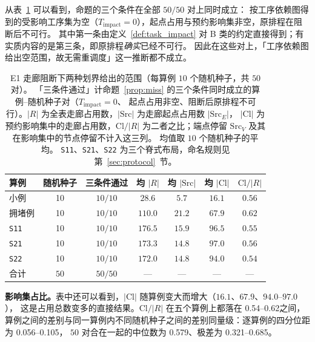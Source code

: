 \documentclass[manuscript,screen,review]{acmart}
\newcommand{\NSeeds}{10}
\newcommand{\NPairs}{50}
\newcommand{\PassMiss}{\NPairs/\NPairs}      %
\newcommand{\EoneCloLo}{0.54}
\newcommand{\EoneCloHi}{0.62}
\newcommand{\EoneFracIqrLo}{0.056}  %
\newcommand{\EoneFracIqrHi}{0.105}  %
\newcommand{\EoneFracMed}{0.579}    %
\newcommand{\EoneFracMin}{0.321}    %
\newcommand{\EoneFracMax}{0.685}    %
\begin{document}
从表~\ref{tab:e1} 可以看到，命题的三个条件在全部 \(\PassMiss\) 对上同时成立：
按工序依赖图得到的受影响工序集为空（\(T_{\mathrm{impact}}=0\)），起点占用与预约影响集非空，原排程在阻断后不可行。
其中第一条由定义~\ref{def:task_impact} 对 B 类的约定直接得到；有实质内容的是第三条，即原排程\emph{确实}已经不可行。
因此在这些对上，「工序依赖图给出空范围，故无需重调度」这一推断都不成立。

\begin{table}[t]
\centering
\caption{E1 走廊阻断下两种划界给出的范围（每算例 \(\NSeeds\) 个随机种子，共 \(\NPairs\) 对）。
「三条件通过」计命题~\ref{prop:miss} 的三个条件同时成立的算例--随机种子对（\(T_{\mathrm{impact}}=0\)、
起点占用非空、阻断后原排程不可行）。\(|R|\) 为全表走廊占用数，\(|\mathrm{Src}|\) 为走廊起点占用数 \(|\mathrm{Src}_E|\)，
\(|\mathrm{Cl}|\) 为预约影响集中的走廊占用数，\(\mathrm{Cl}/|R|\) 为二者之比；端点停留 \(\mathrm{Src}_V\) 及其在影响集中的节点停留不计入这三列。
均值取 \(\NSeeds\) 个随机种子的平均。
\texttt{S11}、\texttt{S21}、\texttt{S22} 为三个脊式布局，命名规则见第~\ref{sec:protocol}~节。}
\label{tab:e1}
\small
\begin{tabular}{@{}lcccccc@{}}
\toprule
算例 & 随机种子 & 三条件通过 & 均 \(|R|\) & 均 \(|\mathrm{Src}|\)
 & 均 \(|\mathrm{Cl}|\) & \(\mathrm{Cl}/|R|\) \\
\midrule
小例   & 10 & \(10/10\) & \(28.6\)  & \(5.7\)  & \(16.1\) & \(0.56\) \\
拥堵例 & 10 & \(10/10\) & \(110.0\) & \(21.2\) & \(67.9\) & \(0.62\) \\
\texttt{S11}  & 10 & \(10/10\) & \(176.5\) & \(15.9\) & \(96.5\) & \(0.55\) \\
\texttt{S21}    & 10 & \(10/10\) & \(173.3\) & \(14.8\) & \(97.0\) & \(0.56\) \\
\texttt{S22}     & 10 & \(10/10\) & \(172.0\) & \(14.8\) & \(94.0\) & \(0.54\) \\
\midrule
合计 & \(\NPairs\) & \(\PassMiss\) & --- & --- & --- & --- \\
\bottomrule
\end{tabular}
\end{table}

\textbf{影响集占比。}表中还可以看到，\(|\mathrm{Cl}|\) 随算例变大而增大（\(16.1\)、\(67.9\)、\(94.0\)--\(97.0\)），
这是占用总数变多的直接结果。\(\mathrm{Cl}/|R|\) 在五个算例上都落在 \EoneCloLo--\EoneCloHi 之间，
算例之间的差别与同一算例内不同随机种子之间的差别同量级：逐算例的四分位距为 \EoneFracIqrLo--\EoneFracIqrHi，
\(\NPairs\) 对合在一起的中位数为 \EoneFracMed、极差为 \EoneFracMin--\EoneFracMax。
\end{document}
